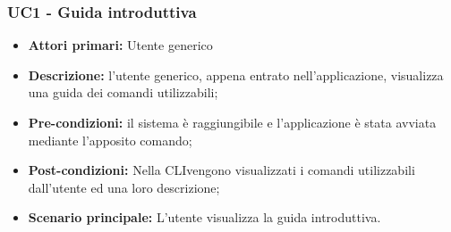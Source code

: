 \subsubsection{UC1 - Guida introduttiva}
\begin{itemize}
	\item \textbf{Attori primari:} Utente generico
	\item \textbf{Descrizione:} l'utente generico, appena entrato nell'applicazione, visualizza una guida dei comandi utilizzabili; 
	\item \textbf{Pre-condizioni:} il sistema è raggiungibile e l'applicazione è stata avviata mediante l'apposito comando;
	\item \textbf{Post-condizioni:} Nella CLI\glo vengono visualizzati i comandi utilizzabili dall'utente ed una loro descrizione;
	\item \textbf{Scenario principale:} L'utente visualizza la guida introduttiva.
\end{itemize}